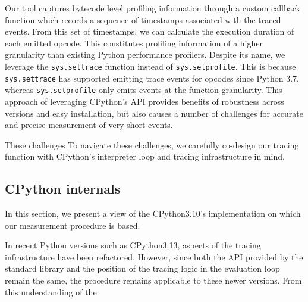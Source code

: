 Our tool captures bytecode level profiling information through a custom callback function which records a sequence of timestamps associated with the traced events.
From this set of timestamps, we can calculate the execution duration of each emitted opcode. This constitutes profiling information of a higher granularity than existing Python performance profilers.
Despite its name, we leverage the \texttt{sys.settrace} function instead of \texttt{sys.setprofile}. This is because \texttt{sys.settrace} has supported emitting trace events for opcodes since Python 3.7, whereas \texttt{sys.setprofile} only emits events at the function granularity.
This approach of leveraging CPython's API provides benefits of robustness across versions and easy installation, but also causes a number of challenges for accurate and precise measurement of very short events.

These challenges
To navigate these challenges, we carefully co-design our tracing function with CPython's interpreter loop and tracing infrastructure in mind.


\subsection{CPython internals}
\label{ssec:profiling-bytecode-cpython-internals}


In this section, we present a view of the CPython3.10's implementation on which our measurement procedure is based.

In recent Python versions such as CPython3.13, aspects of the tracing infrastructure have been refactored. However, since both the API provided by the standard library and the position of the tracing logic in the evaluation loop remain the same, the procedure remains applicable to these newer versions.
From this understanding of the


